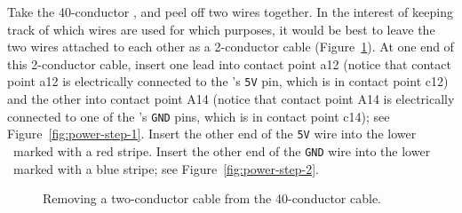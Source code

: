 Take the 40-conductor \rainbow, and peel off two wires together. In the
interest of keeping track of which wires are used for which purposes, it would
be best to leave the two wires attached to each other as a 2-conductor cable
(Figure~\ref{fig:two-wires}). At one end of this 2-conductor cable, insert one
lead into contact point a12 (notice that contact point a12 is electrically
connected to the \nano's \texttt{5V} pin, which is in contact point c12) and
the other into contact point A14 (notice that contact point A14 is electrically
connected to one of the \nano's \texttt{GND} pins, which is in contact point
c14); see Figure~\ref{fig:power-step-1}. Insert the other end of the
\texttt{5V} wire into the lower \power\ marked with a red stripe. Insert the
other end of the \texttt{GND} wire into the lower \ground\ marked with a blue
stripe; see Figure~\ref{fig:power-step-2}.

\begin{figure}
    \centering
    \hfil
    \caption{Removing a two-conductor cable from the 40-conductor cable.\label{fig:two-wires}}
\end{figure}

